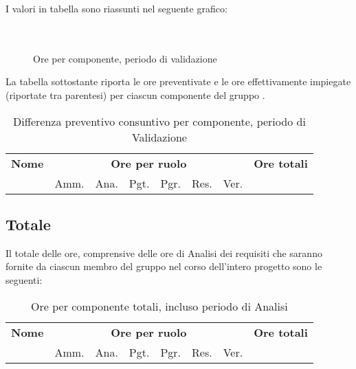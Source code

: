 I valori in tabella sono riassunti nel seguente grafico: \\ \\ \\
\begin{figure}[H]
\caption{Ore per componente, periodo di validazione}
\end{figure}

La tabella sottostante riporta le ore preventivate e le ore effettivamente impiegate (riportate tra parentesi) per ciascun componente del gruppo \GroupName{}.

\begin{center}
\begin{table}[H]
\begin{tabular}{lccccccc}
\toprule
    \textbf{Nome}  & \multicolumn{6}{c}{\textbf{Ore per ruolo}} & \textbf{Ore totali} \\
     & Amm. & Ana. & Pgt. & Pgr. & Res. & Ver. & \\
    \midrule
    
    	
    
    \bottomrule
\end{tabular}
\caption{Differenza preventivo consuntivo per componente, periodo di Validazione}
\end{table}
\end{center}

\pagebreak
\subsection{Totale}

Il totale delle ore, comprensive delle ore di Analisi dei requisiti che saranno fornite da ciascun membro del gruppo nel corso dell'intero progetto sono le seguenti:

\begin{table}[H]
\centering
\begin{tabular}{lccccccc}
\toprule 
    \textbf{Nome}  & \multicolumn{6}{c}{\textbf{Ore per ruolo}} & \textbf{Ore totali}\\
     & Amm. & Ana. & Pgt. & Pgr. & Res. & Ver. \\
    \midrule

		 	

    \bottomrule
\end{tabular}
\caption{Ore per componente totali, incluso periodo di Analisi}
\end{table}


